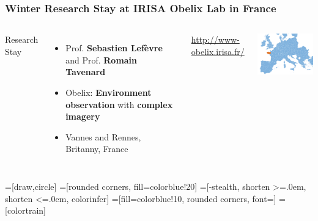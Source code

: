 
\begin{frame}
	\frametitle{Winter Research Stay at IRISA Obelix Lab in France}
	
	\begin{columns}
		
		Research Stay
		\begin{itemize}[itemsep=1em]
			\item Prof. \textbf{Sebastien Lefèvre} and Prof. \textbf{Romain Tavenard}
			\item Obelix: \textbf{Environment observation} with \textbf{complex imagery}
			\item Vannes and Rennes, Britanny, France
		\end{itemize}
		
		\vspace{1em}
		\url{http://www-obelix.irisa.fr/}
		
		
		\includegraphics[width=5cm]{images/map/europe}
		
	\end{columns}
	
\end{frame}
%
%
%	
%		
%	
%	
%	
%
%
%	
%	


=[draw,circle]
=[rounded corners, fill=colorblue!20]
=[-stealth, shorten >=.0em, shorten <=.0em, colorinfer]
=[fill=colorblue!10, rounded corners, font=\small]
=[colortrain]

